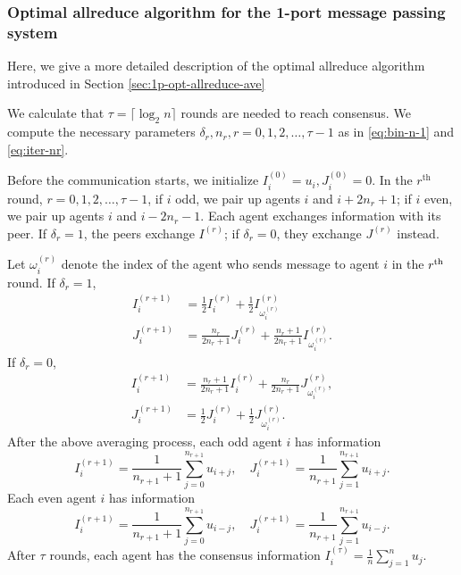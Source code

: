 \documentclass{article}
\newcommand{\ro}{{(r)}}
\theoremstyle{plain}
\theoremstyle{definition}
\begin{document}
\subsubsection{Optimal allreduce algorithm for the 1-port message passing system}
\label{append:CECA-2P}
Here, we give a more detailed description of the optimal allreduce algorithm introduced in Section \ref{sec:1p-opt-allreduce-ave} 

{We calculate that $\tau=\lceil \log_2 n\rceil$ rounds are needed to reach consensus.} We compute the necessary parameters $\delta_r, n_r, r=0,1,2,\ldots,\tau-1$ as in \eqref{eq:bin-n-1} and \eqref{eq:iter-nr}.


Before the communication starts, we initialize $I^{(0)}_i=u_i, J^{(0)}_i=0$. 
In the $r^{\text{th}}$ round, $r=0,1,2,\ldots,\tau-1$, if $i$ odd, we pair up agents $i$ and $i+2n_r+1$; if $i$ even, we pair up agents $i$ and $i-2n_r-1$. Each agent exchanges information with its peer. %
If $\delta_r=1$, the peers exchange $I^\ro$; if $\delta_r=0$, they exchange $J^\ro$ instead.

{Let $\omega^\ro_i$ denote the index of the agent who sends message to agent $i$ in the $r^{\textup{th}}$ round.} If $\delta_r=1$,
\begin{align*}
I^{(r+1)}_i&=\frac{1}{2}I^\ro_i+\frac{1}{2}I^\ro_{\omega^\ro_i}\\
J^{(r+1)}_i&=\frac{n_r}{2n_r+1}J^\ro_i+\frac{n_r+1}{2n_r+1}I^\ro_{\omega^\ro_i}.
\end{align*}
If $\delta_r=0$,
\begin{align*}
I^{(r+1)}_i&=\frac{n_r+1}{2n_r+1}I^\ro_i+\frac{n_r}{2n_r+1}J^\ro_{\omega^\ro_i},\\
J^{(r+1)}_i&=\frac{1}{2}J^\ro_i+\frac{1}{2}J^\ro_{\omega^\ro_i}.
\end{align*}
After the above averaging process, each odd agent $i$ has information
$$I_i^{(r+1)}=\frac{1}{n_{r+1}+1}\sum_{j=0}^{n_{r+1}}u_{i+j},\quad 
J_i^{(r+1)}=\frac{1}{n_{r+1}}\sum_{j=1}^{n_{r+1}}u_{i+j}.$$
Each even agent $i$ has information
$$
I_i^{(r+1)}=\frac{1}{n_{r+1}+1}\sum_{j=0}^{n_{r+1}}u_{i-j},\quad 
J_i^{(r+1)}=\frac{1}{n_{r+1}}\sum_{j=1}^{n_{r+1}}u_{i-j}.$$
After $\tau$ rounds, each agent has the consensus information $I^{(\tau)}_i=\frac{1}{n}\sum_{j=1}^n u_j$. 
\end{document}
